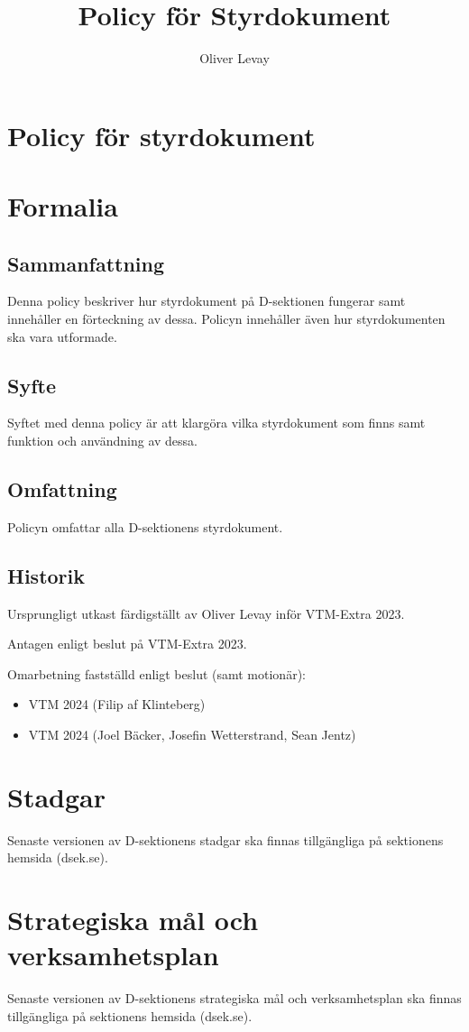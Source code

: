 \documentclass[]{dsekprotokoll}
\title{Policy för Styrdokument}
\author{Oliver Levay}
\begin{document}
\section*{Policy för styrdokument}
\section{Formalia}
\subsection{Sammanfattning}
Denna policy beskriver hur styrdokument på D-sektionen fungerar samt innehåller en förteckning av dessa. Policyn innehåller även hur styrdokumenten ska vara utformade.
\subsection{Syfte}
Syftet med denna policy är att klargöra vilka styrdokument som finns samt funktion och användning av dessa.
\subsection{Omfattning}
Policyn omfattar alla D-sektionens styrdokument.

\subsection{Historik}
Ursprungligt utkast färdigställt av Oliver Levay inför VTM-Extra 2023.

Antagen enligt beslut på VTM-Extra 2023.

Omarbetning fastställd enligt beslut (samt motionär):
\begin{itemize}
    \item VTM 2024 (Filip af Klinteberg)
    \item VTM 2024 (Joel Bäcker, Josefin Wetterstrand, Sean Jentz)
\end{itemize}

\section{Stadgar}
Senaste versionen av D-sektionens stadgar ska finnas tillgängliga på sektionens hemsida (dsek.se).

\section{Strategiska mål och verksamhetsplan}
Senaste versionen av D-sektionens strategiska mål och verksamhetsplan ska finnas tillgängliga på sektionens hemsida (dsek.se).
\end{document}
